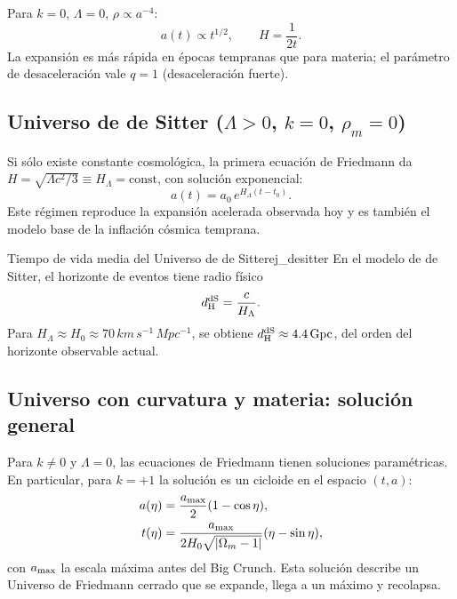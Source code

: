 Para $k=0$, $\Lambda=0$, $\rho\propto a^{-4}$:
\begin{equation}
  a(t)\propto t^{1/2},\qquad H=\frac{1}{2t}.
  \label{eq:a_radiacion}
\end{equation}
La expansión es más rápida en épocas tempranas que para materia; el parámetro de desaceleración vale $q=1$ (desaceleración fuerte).

\subsection{Universo de de Sitter ($\Lambda > 0$, $k=0$, $\rho_m=0$)}

Si sólo existe constante cosmológica, la primera ecuación de Friedmann da $H=\sqrt{\Lambda c^2/3}\equiv H_\Lambda=\text{const}$, con solución exponencial:
\begin{equation}
  \boxed{a(t) = a_0\,e^{H_\Lambda(t-t_0)}.}
  \label{eq:de_sitter}
\end{equation}
Este régimen reproduce la expansión acelerada observada hoy y es también el modelo base de la inflación cósmica temprana.

\begin{ejemplo}{Tiempo de vida media del Universo de de Sitter}{ej_desitter}
En el modelo de de Sitter, el horizonte de eventos tiene radio físico
\begin{equation}
  d_{\rm H}^{\rm dS} = \frac{c}{H_\Lambda}.
\end{equation}
Para $H_\Lambda\approx H_0\approx 70\,\si{km\,s^{-1}\,Mpc^{-1}}$, se obtiene $d_{\rm H}^{\rm dS}\approx 4.4\,\si{Gpc}$, del orden del horizonte observable actual.
\end{ejemplo}

\subsection{Universo con curvatura y materia: solución general}

Para $k\neq0$ y $\Lambda=0$, las ecuaciones de Friedmann tienen soluciones paramétricas. En particular, para $k=+1$ la solución es un cicloide en el espacio $(t,a)$:
\begin{align}
  a(\eta) &= \frac{a_{\rm max}}{2}(1-\cos\eta),\\
  t(\eta) &= \frac{a_{\rm max}}{2H_0\sqrt{|\Omega_m-1|}}(\eta-\sin\eta),
\end{align}
con $a_{\rm max}$ la escala máxima antes del Big Crunch. Esta solución describe un Universo de Friedmann cerrado que se expande, llega a un máximo y recolapsa.

